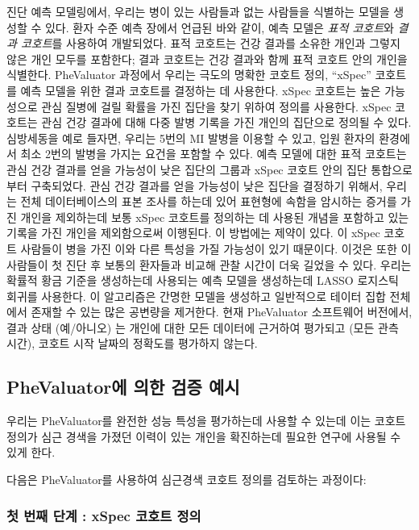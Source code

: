 \documentclass[11pt]{book}
\theoremstyle{definition}
\theoremstyle{definition}
\theoremstyle{definition}
\theoremstyle{remark}
\begin{document}
진단 예측 모델링에서, 우리는 병이 있는 사람들과 없는 사람들을 식별하는
모델을 생성할 수 있다. 환자 수준 예측 장에서 언급된 바와 같이, 예측
모델은 \emph{표적 코호트}와 \emph{결과 코호트}를 사용하여 개발되었다.
표적 코호트는 건강 결과를 소유한 개인과 그렇지 않은 개인 모두를
포함한다; 결과 코호트는 건강 결과와 함께 표적 코호트 안의 개인을
식별한다. PheValuator 과정에서 우리는 극도의 명확한 코호트 정의,
``xSpec'' 코호트를 예측 모델을 위한 결과 코호트를 결정하는 데 사용한다.
xSpec 코호트는 높은 가능성으로 관심 질병에 걸릴 확률을 가진 집단을 찾기
위하여 정의를 사용한다. xSpec 코호트는 관심 건강 결과에 대해 다중 발병
기록을 가진 개인의 집단으로 정의될 수 있다. 심방세동을 예로 들자면,
우리는 5번의 MI 발병을 이용할 수 있고, 입원 환자의 환경에서 최소 2번의
발병을 가지는 요건을 포함할 수 있다. 예측 모델에 대한 표적 코호트는 관심
건강 결과를 얻을 가능성이 낮은 집단의 그룹과 xSpec 코호트 안의 집단
통합으로부터 구축되었다. 관심 건강 결과를 얻을 가능성이 낮은 집단을
결정하기 위해서, 우리는 전체 데이터베이스의 표본 조사를 하는데 있어
표현형에 속함을 암시하는 증거를 가진 개인을 제외하는데 보통 xSpec
코호트를 정의하는 데 사용된 개념을 포함하고 있는 기록을 가진 개인을
제외함으로써 이행된다. 이 방법에는 제약이 있다. 이 xSpec 코호트 사람들이
병을 가진 이와 다른 특성을 가질 가능성이 있기 때문이다. 이것은 또한 이
사람들이 첫 진단 후 보통의 환자들과 비교해 관찰 시간이 더욱 길었을 수
있다. 우리는 확률적 황금 기준을 생성하는데 사용되는 예측 모델을
생성하는데 LASSO 로지스틱 회귀를 사용한다. \citep{suchard_2013} 이
알고리즘은 간명한 모델을 생성하고 일반적으로 테이터 집합 전체에서 존재할
수 있는 많은 공변량을 제거한다. 현재 PheValuator 소프트웨어 버전에서,
결과 상태 (예/아니오) 는 개인에 대한 모든 데이터에 근거하여 평가되고
(모든 관측 시간), 코호트 시작 날짜의 정확도를 평가하지 않는다.

\subsection{PheValuator에 의한 검증 예시}\label{phevaluator---}

우리는 PheValuator를 완전한 성능 특성을 평가하는데 사용할 수 있는데 이는
코호트 정의가 심근 경색을 가졌던 이력이 있는 개인을 확진하는데 필요한
연구에 사용될 수 있게 한다.

다음은 PheValuator를 사용하여 심근경색 코호트 정의를 검토하는 과정이다:

\subsubsection*{첫 번째 단계 : xSpec 코호트 정의}\label{---xspec--}
\end{document}
